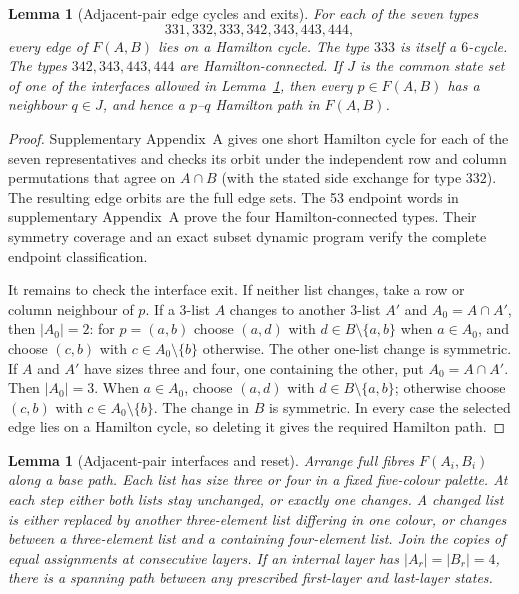 \documentclass[11pt]{article}
\newtheorem{lemma}[theorem]{Lemma}
\theoremstyle{remark}
\numberwithin{equation}{section}
\numberwithin{table}{section}
\begin{document}
\begin{lemma}[Adjacent-pair edge cycles and exits]
\label{lem:pair-five-endpoints}
For each of the seven types
\[
331,332,333,342,343,443,444,
\]
every edge of $F(A,B)$ lies on a Hamilton cycle.  The type $333$ is
itself a $6$-cycle.  The types $342,343,443,444$ are
Hamilton-connected.  If $J$ is the common state set of one of the
interfaces allowed in Lemma~\ref{lem:pair-five-reset}, then every
$p\in F(A,B)$ has a neighbour $q\in J$, and hence a $p$--$q$
Hamilton path in $F(A,B)$.
\end{lemma}

\begin{proof}
Supplementary Appendix~A gives one short Hamilton cycle for each of
the seven representatives and checks its orbit under the independent
row and column permutations that agree on $A\cap B$ (with the stated
side exchange for type $332$).  The resulting edge orbits are the full
edge sets.  The 53 endpoint words in supplementary Appendix~A prove the four
Hamilton-connected types. Their symmetry coverage and an exact subset
dynamic program verify the complete endpoint classification.

It remains to check the interface exit.  If neither list changes,
take a row or column neighbour of $p$. If a $3$-list $A$ changes to
another $3$-list $A'$ and $A_0=A\cap A'$, then $|A_0|=2$: for $p=(a,b)$ choose
$(a,d)$ with $d\in B\setminus\{a,b\}$ when $a\in A_0$, and choose
$(c,b)$ with $c\in A_0\setminus\{b\}$ otherwise.  The other
one-list change is symmetric. If $A$ and $A'$ have sizes three and
four, one containing the other, put $A_0=A\cap A'$. Then $|A_0|=3$.
When $a\in A_0$, choose $(a,d)$ with $d\in B\setminus\{a,b\}$;
otherwise choose $(c,b)$ with $c\in A_0\setminus\{b\}$. The change
in $B$ is symmetric. In every case the selected edge lies
on a Hamilton cycle, so deleting it gives the required Hamilton path.
\end{proof}



\begin{lemma}[Adjacent-pair interfaces and reset]
\label{lem:pair-five-reset}
Arrange full fibres $F(A_i,B_i)$ along a base path.  Each list has
size three or four in a fixed five-colour palette.  At each step either
both lists stay unchanged, or exactly one changes. A changed list
is either replaced by another three-element list differing in one
colour, or changes between a three-element list and a containing
four-element list.
Join the copies of equal assignments at consecutive layers.  If an
internal layer has $|A_r|=|B_r|=4$, there is a spanning path between
any prescribed first-layer and last-layer states.
\end{lemma}
\end{document}
